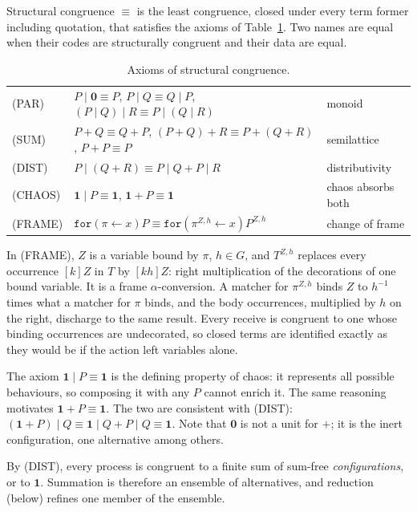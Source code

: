 \documentclass[11pt]{article}
\theoremstyle{definition}
\theoremstyle{remark}
\newcommand{\nil}{\mathbf{0}}
\newcommand{\chaos}{\mathbf{1}}
\newcommand{\rcv}[3]{\mathtt{for}(#1 \leftarrow #2)#3}
\newcommand{\scong}{\equiv}
\newcommand{\fr}[2]{[#1]#2}
\begin{document}
Structural congruence $\scong$ is the least congruence, closed under every
term former including quotation, that satisfies the axioms of
Table~\ref{tab:scong}. Two names are equal when their codes are structurally
congruent and their data are equal.

\begin{table}[ht]
\centering
\begin{tabular}{@{}lll@{}}
\toprule
(PAR) & $P\mid\nil \scong P$,\; $P\mid Q\scong Q\mid P$,\;
        $(P\mid Q)\mid R\scong P\mid(Q\mid R)$ & monoid\\
(SUM) & $P+Q\scong Q+P$,\; $(P+Q)+R\scong P+(Q+R)$,\; $P+P\scong P$
      & semilattice\\
(DIST) & $P\mid(Q+R)\scong P\mid Q + P\mid R$ & distributivity\\
(CHAOS) & $\chaos\mid P\scong\chaos$,\; $\chaos + P \scong \chaos$ &
  chaos absorbs both\\
(FRAME) & $\rcv{\pi}{x}{P}\scong\rcv{\pi^{Z,h}}{x}{P^{Z,h}}$ &
  change of frame\\
\bottomrule
\end{tabular}
\caption{Axioms of structural congruence.}
\label{tab:scong}
\end{table}

In (FRAME), $Z$ is a variable bound by $\pi$, $h\in G$, and $T^{Z,h}$
replaces every occurrence $\fr{k}{Z}$ in $T$ by $\fr{kh}{Z}$: right
multiplication of the decorations of one bound variable. It is a frame
$\alpha$-conversion. A matcher for $\pi^{Z,h}$ binds $Z$ to $h^{-1}$ times
what a matcher for $\pi$ binds, and the body occurrences, multiplied by $h$ on
the right, discharge to the same result. Every receive is congruent to one
whose binding occurrences are undecorated, so closed terms are identified
exactly as they would be if the action left variables alone.

The axiom $\chaos\mid P\scong\chaos$ is the defining property of chaos: it
represents all possible behaviours, so composing it with any $P$ cannot
enrich it. The same reasoning motivates $\chaos+P\scong\chaos$. The two are
consistent with (DIST):
$(\chaos+P)\mid Q\scong\chaos\mid Q + P\mid Q\scong\chaos$. Note that $\nil$ is
not a unit for $+$; it is the inert configuration, one alternative among
others.

By (DIST), every process is congruent to a finite sum of sum-free
\emph{configurations}, or to $\chaos$. Summation is therefore an ensemble of
alternatives, and reduction (below) refines one member of the ensemble.
\end{document}

